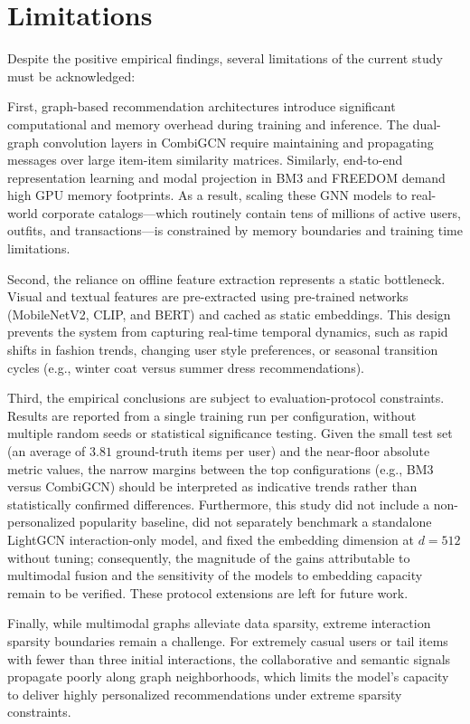 \section{Limitations}

Despite the positive empirical findings, several limitations of the current study must be acknowledged:

First, graph-based recommendation architectures introduce significant computational and memory overhead during training and inference. The dual-graph convolution layers in CombiGCN require maintaining and propagating messages over large item-item similarity matrices. Similarly, end-to-end representation learning and modal projection in BM3 and FREEDOM demand high GPU memory footprints. As a result, scaling these GNN models to real-world corporate catalogs—which routinely contain tens of millions of active users, outfits, and transactions—is constrained by memory boundaries and training time limitations.

Second, the reliance on offline feature extraction represents a static bottleneck. Visual and textual features are pre-extracted using pre-trained networks (MobileNetV2, CLIP, and BERT) and cached as static embeddings. This design prevents the system from capturing real-time temporal dynamics, such as rapid shifts in fashion trends, changing user style preferences, or seasonal transition cycles (e.g., winter coat versus summer dress recommendations).

Third, the empirical conclusions are subject to evaluation-protocol constraints. Results are reported from a single training run per configuration, without multiple random seeds or statistical significance testing. Given the small test set (an average of $3.81$ ground-truth items per user) and the near-floor absolute metric values, the narrow margins between the top configurations (e.g., BM3 versus CombiGCN) should be interpreted as indicative trends rather than statistically confirmed differences. Furthermore, this study did not include a non-personalized popularity baseline, did not separately benchmark a standalone LightGCN interaction-only model, and fixed the embedding dimension at $d=512$ without tuning; consequently, the magnitude of the gains attributable to multimodal fusion and the sensitivity of the models to embedding capacity remain to be verified. These protocol extensions are left for future work.

Finally, while multimodal graphs alleviate data sparsity, extreme interaction sparsity boundaries remain a challenge. For extremely casual users or tail items with fewer than three initial interactions, the collaborative and semantic signals propagate poorly along graph neighborhoods, which limits the model's capacity to deliver highly personalized recommendations under extreme sparsity constraints.
